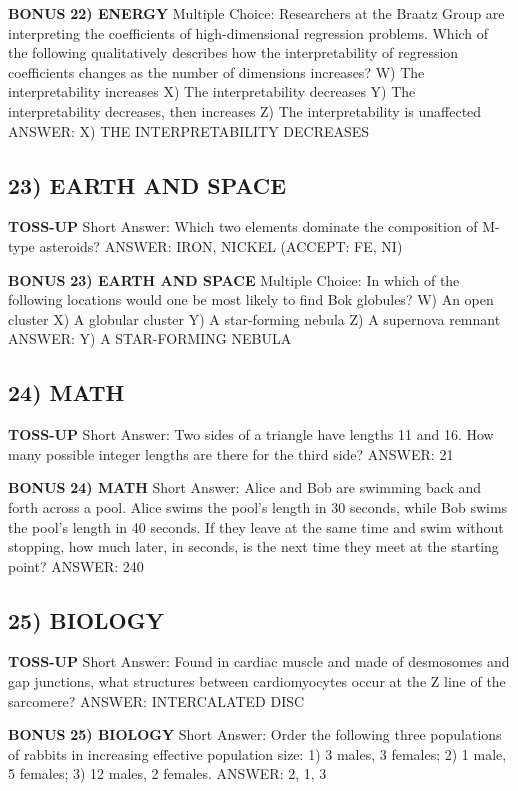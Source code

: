 \documentclass{article}
\begin{document}
\textbf{BONUS}
\textbf{22) ENERGY}
Multiple Choice: Researchers at the Braatz Group are interpreting the coefficients of high-dimensional regression problems. Which of the following qualitatively describes how the interpretability of regression coefficients changes as the number of dimensions increases?
W) The interpretability increases
X) The interpretability decreases
Y) The interpretability decreases, then increases
Z) The interpretability is unaffected
ANSWER: X) THE INTERPRETABILITY DECREASES

\subsection*{23) EARTH AND SPACE}
\textbf{TOSS-UP}
Short Answer: Which two elements dominate the composition of M-type asteroids?
ANSWER: IRON, NICKEL (ACCEPT: FE, NI)

\textbf{BONUS}
\textbf{23) EARTH AND SPACE}
Multiple Choice: In which of the following locations would one be most likely to find Bok globules?
W) An open cluster
X) A globular cluster
Y) A star-forming nebula
Z) A supernova remnant
ANSWER: Y) A STAR-FORMING NEBULA

\subsection*{24) MATH}
\textbf{TOSS-UP}
Short Answer: Two sides of a triangle have lengths 11 and 16. How many possible integer lengths are there for the third side?
ANSWER: 21

\textbf{BONUS}
\textbf{24) MATH}
Short Answer: Alice and Bob are swimming back and forth across a pool. Alice swims the pool's length in 30 seconds, while Bob swims the pool's length in 40 seconds. If they leave at the same time and swim without stopping, how much later, in seconds, is the next time they meet at the starting point?
ANSWER: 240

\subsection*{25) BIOLOGY}
\textbf{TOSS-UP}
Short Answer: Found in cardiac muscle and made of desmosomes and gap junctions, what structures between cardiomyocytes occur at the Z line of the sarcomere?
ANSWER: INTERCALATED DISC

\textbf{BONUS}
\textbf{25) BIOLOGY}
Short Answer: Order the following three populations of rabbits in increasing effective population size: 1) 3 males, 3 females; 2) 1 male, 5 females; 3) 12 males, 2 females.
ANSWER: 2, 1, 3
\end{document}
